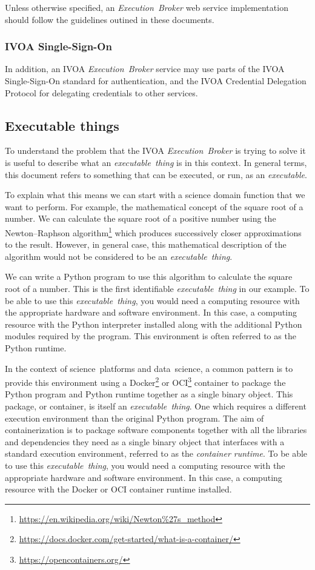 \documentclass[11pt,a4paper]{ivoa}
\newcommand{\webservice} {web service}
\newcommand{\ivoa} {IVOA}
\newcommand{\executionbroker} {\textit{Execution~Broker}}
\newcommand{\executable} {\textit{executable}}
\newcommand{\executablething}[1] {\textit{executable~thing#1}}
\newcommand{\python} {Python}
\newcommand{\pythonprogram} {Python program}
\newcommand{\ocicontainer} {OCI container}
\newcommand{\docker} {Docker}
\newcommand{\footurl}[1] {\footnote{\url{#1}}}
\newcommand{\datascience} {data~science}
\newcommand{\scienceplatform}[1] {science~platform#1}
\begin{document}
Unless otherwise specified, an \executionbroker{} \webservice{} implementation
should follow the guidelines outined in these documents.

\subsubsection{IVOA Single-Sign-On}
\label{ivoa-sso}

In addition, an \ivoa{} \executionbroker{} service may use parts of the
\ivoa{} Single-Sign-On standard\citep{2017ivoa.spec.0524T}
for authentication, and the
\ivoa{} Credential Delegation Protocol \citep{2010ivoa.spec.0218P}
for delegating credentials to other services.

\subsection{Executable things}
\label{executablething}

To understand the problem that the \ivoa{} \executionbroker{} is trying to solve
it is useful to describe what an \executablething{} is in this context.
In general terms, this document refers to something that can be executed, or run,
as an \executable{}.

To explain what this means we can start with a science domain function that we want to perform.
For example, the mathematical concept of the square root of a number.
We can calculate the square root of a positive number using the Newton–Raphson
algorithm\footurl{https://en.wikipedia.org/wiki/Newton\%27s_method}
which produces successively closer approximations to the result.
However, in general case, this mathematical description of the algorithm would not be
considered to be an \executablething{}.

We can write a \pythonprogram{} to use this algorithm to calculate the square root of a number.
This is the first identifiable \executablething{} in our example.
To be able to use this \executablething{}, you would need a computing resource with the appropriate
hardware and software environment. In this case, a computing resource with the \python{} interpreter
installed along with the additional \python{} modules required by the program.
This environment is often referred to as the \python{} runtime.

In the context of \scienceplatform{s} and \datascience{}, a common pattern is to provide this environment
using a Docker\footurl{https://docs.docker.com/get-started/what-is-a-container/}
or OCI\footurl{https://opencontainers.org/} container
to package the \pythonprogram{} and \python{} runtime together as a single binary object.
This package, or container, is itself an \executablething{}. One which requires a different execution
environment than the original \pythonprogram{}.
The aim of containerization is to package software components together with all the libraries and dependencies
they need as a single binary object that interfaces with a standard execution environment,
referred to as the \textit{container runtime}.
To be able to use this \executablething{}, you would need a computing resource with the appropriate
hardware and software environment. In this case, a computing resource with the \docker{} or \ocicontainer{}
runtime installed.
\end{document}
